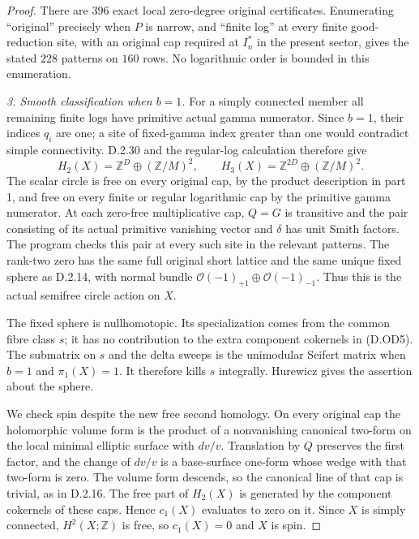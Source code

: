 \begin{proof}
There are $396$ exact local zero-degree original certificates.
Enumerating ``original'' precisely when $P$ is narrow,
and ``finite log'' at every finite good-reduction site,
with an original cap required at $I_n^*$ in the present
sector, gives the stated $228$ patterns on $160$ rows.
No logarithmic order is bounded in this enumeration.

\emph{3. Smooth classification when $b=1$.}
For a simply connected member all remaining finite logs have
primitive actual gamma numerator. Since $b=1$, their indices
$q_i$ are one; a site of fixed-gamma index greater than one
would contradict simple connectivity. D.2.30 and the
regular-log calculation therefore give
\[
 H_2(X)=\mathbb Z^D\oplus(\mathbb Z/M)^2,
 \qquad H_3(X)=\mathbb Z^{2D}\oplus(\mathbb Z/M)^2.
\]
The scalar circle is free on every original cap, by the
product description in part 1, and free on every finite
or regular logarithmic cap by the primitive gamma numerator.
At each zero-free multiplicative cap, $Q=G$ is transitive
and the pair consisting of its actual primitive vanishing
vector and $\delta$ has unit Smith factors. The program
checks this pair at every such site in the relevant patterns.
The rank-two zero has the same full original short lattice
and the same unique fixed sphere as D.2.14, with normal
bundle $\mathcal O(-1)_{+1}\oplus\mathcal O(-1)_{-1}$.
Thus this is the actual semifree circle action on $X$.

The fixed sphere is nullhomotopic. Its specialization comes
from the common fibre class $s$; it has no contribution to
the extra component cokernels in (D.OD5). The submatrix on
$s$ and the delta sweeps is the unimodular Seifert matrix
when $b=1$ and $\pi_1(X)=1$. It therefore kills $s$
integrally. Hurewicz gives the assertion about the sphere.

We check spin despite the new free second homology. On every
original cap the holomorphic volume form is the product of
a nonvanishing canonical two-form on the local minimal
elliptic surface with $dv/v$. Translation by $Q$ preserves
the first factor, and the change of $dv/v$ is a base-surface
one-form whose wedge with that two-form is zero. The volume
form descends, so the canonical line of that cap is trivial,
as in D.2.16. The free part of $H_2(X)$ is generated by the
component cokernels of these caps. Hence $c_1(X)$ evaluates
to zero on it. Since $X$ is simply connected,
$H^2(X;\mathbb Z)$ is free, so $c_1(X)=0$ and $X$ is spin.


\end{proof}
